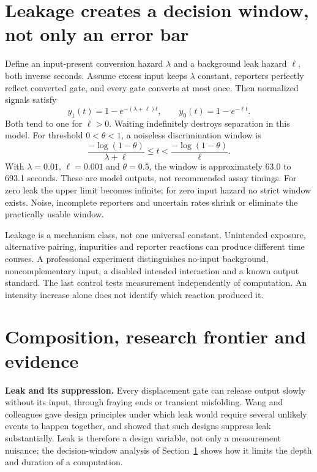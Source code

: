 \section{Leakage creates a decision window, not only an error bar}\label{sec:leak}
Define an input-present conversion hazard $\lambda$ and a background leak
hazard $\ell$, both inverse seconds. Assume excess input keeps $\lambda$
constant, reporters perfectly reflect converted gate, and every gate converts
at most once. Then normalized signals satisfy
\begin{equation}
 y_1(t)=1-e^{-(\lambda+\ell)t},\qquad
 y_0(t)=1-e^{-\ell t}.
\end{equation}
Both tend to one for $\ell>0$. Waiting indefinitely destroys separation in
this model. For threshold $0<\theta<1$, a noiseless discrimination window is
\begin{equation}
 \frac{-\log(1-\theta)}{\lambda+\ell}\leq t
 <\frac{-\log(1-\theta)}{\ell}.
\end{equation}
With $\lambda=0.01$, $\ell=0.001$ and $\theta=0.5$, the window is approximately
63.0 to 693.1 seconds. These are model outputs, not recommended assay timings.
For zero leak the upper limit becomes infinite; for zero input hazard no
strict window exists. Noise, incomplete reporters and uncertain rates shrink
or eliminate the practically usable window.

Leakage is a mechanism class, not one universal constant. Unintended exposure,
alternative pairing, impurities and reporter reactions can produce different
time courses. A professional experiment distinguishes no-input background,
noncomplementary input, a disabled intended interaction and a known output
standard. The last control tests measurement independently of computation.
An intensity increase alone does not identify which reaction produced it.

\section{Composition, research frontier and evidence}
\begin{Frontier}
\textbf{Leak and its suppression.} Every displacement gate can release output
slowly without its input, through fraying ends or transient misfolding. Wang and
colleagues gave design principles under which leak would require several
unlikely events to happen together, and showed that such designs suppress leak
substantially.\cite{Wang2018} Leak is therefore a design variable, not
only a measurement nuisance; the decision-window analysis of
Section~\ref{sec:leak} shows how it limits the depth and duration of a
computation.
\end{Frontier}

